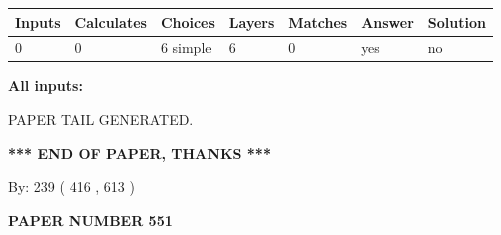 \documentclass[12pt]{article}
\begin{document}
 
\noindent{}
 
 
   
   
   
   
\noindent\begin{tabular}{|l|l|l|l|l|l|l|}
 \hline
Inputs & Calculates & Choices & Layers & Matches & Answer & Solution \\ \hline
 0  & 
 0  & 
 6
  simple  
  & 
 6  & 
 0  & 
  yes & 
  no 
  \\ \hline
 \end{tabular}
   
   
   
   
\noindent{}
   
   
   
   
\noindent\vspace{0.1in}\hspace{-0.08in} {\textbf{\Large{All inputs: }}}
   
   
   
   
   
   
 \vspace{0.2in}
 
   
   
\vspace{2.0in} PAPER TAIL GENERATED.
   
   
   
   
\vspace{1.0in} 
{\textbf{\large{ *** END OF PAPER, THANKS *** }}} 
   
   
\hspace{1.0in} By: 
 239 ( 416 ,  613 )
   
   
   
   
\newpage 
\setcounter{page}{ 
   551001 } 
   
   
   
   
 {\textbf{ \Large{ PAPER NUMBER  551  }}}
   
   
\vspace{0.2in}
   
   
   
   
   
   
   
   
 \vspace{0.2in}
 
\end{document}
